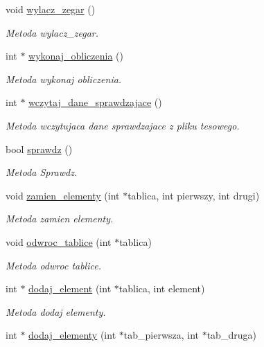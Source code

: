 \begin{DoxyCompactItemize}
void \hyperlink{classalgorytm_a12c132e1a407f5dd38796f4d24308a6c}{wylacz\-\_\-zegar} ()
\begin{DoxyCompactList}\small\item\em Metoda wylacz\-\_\-zegar. \end{DoxyCompactList}\item 
int $\ast$ \hyperlink{classalgorytm_a78f39eb60ed01731efe1b69af93b0ab1}{wykonaj\-\_\-obliczenia} ()
\begin{DoxyCompactList}\small\item\em Metoda wykonaj obliczenia. \end{DoxyCompactList}\item 
int $\ast$ \hyperlink{classalgorytm_a218800ae392b95a6f257538940ee0c12}{wczytaj\-\_\-dane\-\_\-sprawdzajace} ()
\begin{DoxyCompactList}\small\item\em Metoda wczytujaca dane sprawdzajace z pliku tesowego. \end{DoxyCompactList}\item 
bool \hyperlink{classalgorytm_a238208b7d91fb5bf21c2262dfade6add}{sprawdz} ()
\begin{DoxyCompactList}\small\item\em Metoda Sprawdz. \end{DoxyCompactList}\item 
void \hyperlink{classalgorytm_ae0bcecdcf531d82d6f7fe07b669e8953}{zamien\-\_\-elementy} (int $\ast$tablica, int pierwszy, int drugi)
\begin{DoxyCompactList}\small\item\em Metoda zamien elementy. \end{DoxyCompactList}\item 
void \hyperlink{classalgorytm_acf5c24637c36aed90a4703c23d645e88}{odwroc\-\_\-tablice} (int $\ast$tablica)
\begin{DoxyCompactList}\small\item\em Metoda odwroc tablice. \end{DoxyCompactList}\item 
int $\ast$ \hyperlink{classalgorytm_abba1df6da457b63d6405de3191ecf8fc}{dodaj\-\_\-element} (int $\ast$tablica, int element)
\begin{DoxyCompactList}\small\item\em Metoda dodaj elementy. \end{DoxyCompactList}\item 
int $\ast$ \hyperlink{classalgorytm_a8ea259f4037d0ae2f8d3cffbafd9aa30}{dodaj\-\_\-elementy} (int $\ast$tab\-\_\-pierwsza, int $\ast$tab\-\_\-druga)

\end{DoxyCompactItemize}
